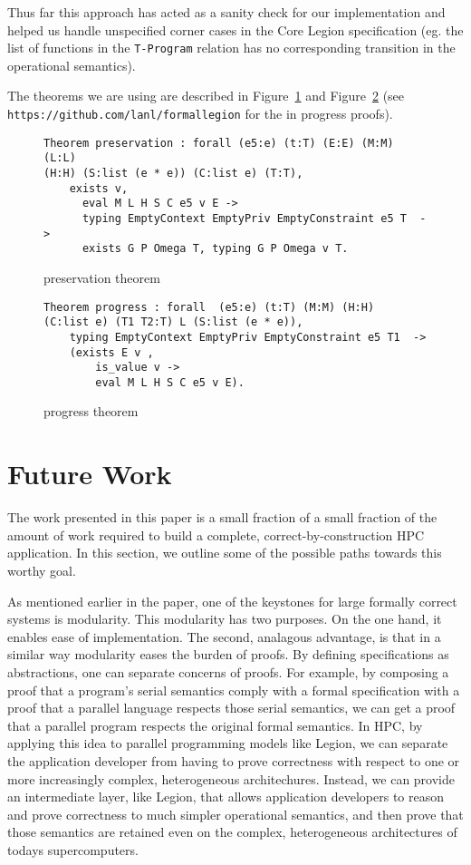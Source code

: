 \documentclass[sigconf]{acmart}
\begin{document}
Thus far this approach has acted as a sanity check for our implementation and
helped us handle unspecified corner cases in the Core Legion specification (eg.
the list of functions in the \texttt{T-Program} relation has no corresponding
transition in the operational semantics). 

The theorems we are using are described in Figure~\ref{preservationtheorem} and
Figure~\ref{progresstheorem} (see \texttt{https://github.com/lanl/formallegion}
for the in progress proofs). 

\begin{figure}
\begin{BVerbatim}
Theorem preservation : forall (e5:e) (t:T) (E:E) (M:M) (L:L) 
(H:H) (S:list (e * e)) (C:list e) (T:T),
    exists v,
      eval M L H S C e5 v E ->
      typing EmptyContext EmptyPriv EmptyConstraint e5 T  ->
      exists G P Omega T, typing G P Omega v T.
\end{BVerbatim}
\caption{preservation theorem}
\label{preservationtheorem}
\end{figure}

\begin{figure}
\begin{BVerbatim}
Theorem progress : forall  (e5:e) (t:T) (M:M) (H:H)  
(C:list e) (T1 T2:T) L (S:list (e * e)),
    typing EmptyContext EmptyPriv EmptyConstraint e5 T1  ->
    (exists E v ,
        is_value v ->
        eval M L H S C e5 v E).
\end{BVerbatim}
\caption{progress theorem}
\label{progresstheorem}
\end{figure}


\section{Future Work}

The work presented in this paper is a small fraction of a small fraction of the
amount of work required to build a complete, correct-by-construction HPC
application. In this section, we outline some of the possible paths towards
this worthy goal. 

As mentioned earlier in the paper, one of the keystones for large formally
correct systems is modularity. This modularity has two purposes. On the one
hand, it enables ease of implementation. The second, analagous advantage, is
that in a similar way modularity eases the burden of proofs. By defining
specifications as abstractions, one can separate concerns of proofs. For
example, by composing a proof that a program's serial semantics comply with a
formal specification with a proof that a parallel language respects those
serial semantics, we can get a proof that a parallel program respects the
original formal semantics. In HPC, by applying this idea to parallel
programming models like Legion, we can separate the application developer from
having to prove correctness with respect to one or more increasingly complex,
heterogeneous architechures. Instead, we can provide an intermediate layer,
like Legion, that allows application developers to reason and prove correctness
to much simpler operational semantics, and then prove that those semantics are
retained even on the complex, heterogeneous architectures of todays
supercomputers.
\end{document}
